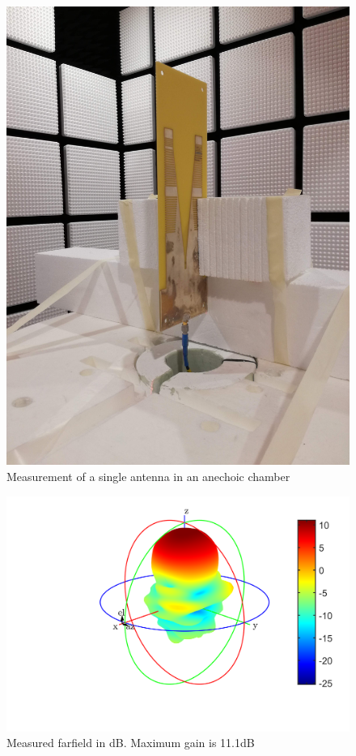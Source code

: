 \begin{figure}[H]
\centering 
\includegraphics[scale = 0.05]{figures/measurement/antennas/one_ant.jpg}
\caption{Measurement of a single antenna in an anechoic chamber}
\label{fig:chamber_one_ant}
\end{figure} 

\begin{figure}[H]
\centering 
\includegraphics[scale = 0.8]{figures/measurement/antennas/one_ant.png}
\caption{Measured farfield in dB. Maximum gain is 11.1dB}
\label{fig:chamber_one_ant_ff}
\end{figure} 



